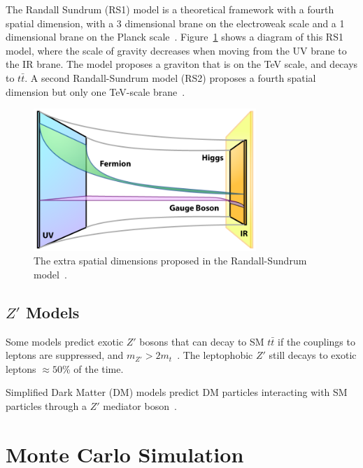 The Randall Sundrum (RS1) model is a theoretical framework with a fourth spatial dimension, with a 3 dimensional brane on the electroweak scale and a 1 dimensional brane on the Planck scale~\cite{rs1}. Figure~\ref{fig:rsbrane} shows a diagram of this RS1 model, where the scale of gravity decreases when moving from the UV brane to the IR brane. The model proposes a graviton that is on the TeV scale, and decays to $t\bar{t}$. A second Randall-Sundrum model (RS2) proposes a fourth spatial dimension but only one TeV-scale brane~\cite{rs2}.

\begin{figure}[h]
	\centering
	\includegraphics[width=0.75\textwidth]{figures/RSBrane.png}
	\caption{The extra spatial dimensions proposed in the Randall-Sundrum model~\cite{RSBrane}.}
	\label{fig:rsbrane}
\end{figure}



%
%
%
%
%
%
\subsection*{$Z'$ Models}

Some models predict exotic $Z'$ bosons that can decay to SM $t\bar{t}$ if the couplings to leptons are suppressed, and $m_{Z'} > 2m_{t}$~\cite{leptophobicZprime}. The leptophobic $Z'$ still decays to exotic leptons $\approx 50$\% of the time.

Simplified Dark Matter (DM) models predict DM particles interacting with SM particles through a $Z'$ mediator boson~\cite{wasmer_dark_matter}.

\section{Monte Carlo Simulation}

